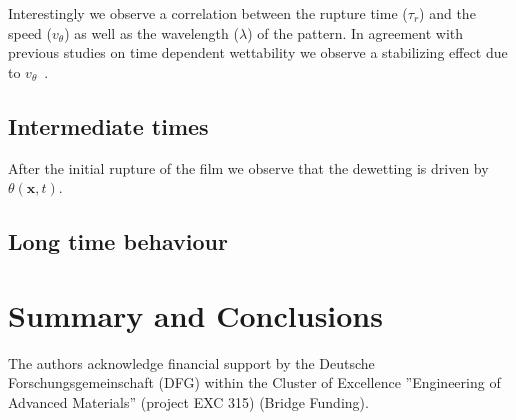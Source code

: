 \documentclass[twocolumn,amsmath,amssymb,showpacs,pre,nofootinbib,superscriptaddress]{revtex4-1} %
\begin{document}
Interestingly we observe a correlation between the rupture time ($\tau_r$) and the speed ($v_{\theta}$) as well as the wavelength ($\lambda$) of the pattern.
In agreement with previous studies on time dependent wettability we observe a stabilizing effect due to $v_{\theta}$~\cite{suman2006dynamics}.

\subsection{Intermediate times}\label{subsec:interT}
After the initial rupture of the film we observe that the dewetting is driven by $\theta(\mathbf{x},t)$.



\subsection{Long time behaviour}\label{subsec:lateT}

\section{Summary and Conclusions}\label{sec:sum_conclu}

\begin{acknowledgements}
The authors acknowledge financial support by the Deutsche Forschungsgemeinschaft (DFG) within the Cluster of Excellence ''Engineering of Advanced Materials'' (project EXC 315) (Bridge Funding). 
\end{acknowledgements}



\end{document}
